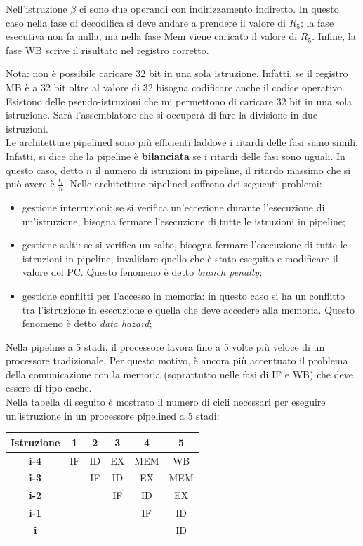 \documentclass{article}
\begin{document}
Nell'istruzione $\beta$ ci sono due operandi con indirizzamento indiretto. In 
questo caso nella fase di decodifica si deve andare a prendere il valore di $R_5
$;
la fase esecutiva non fa nulla, ma nella fase Mem viene caricato il valore di
$R_5$.
Infine, la fase WB scrive il risultato nel registro corretto.

Nota: non è possibile caricare 32 bit in una sola istruzione. 
Infatti, se il registro MB è a 32 bit oltre al valore di 32 bisogna codificare
anche il codice operativo.
Esistono delle pseudo-istruzioni che mi permettono di caricare 32 bit in una 
sola istruzione. Sarà l'assemblatore che si occuperà di fare la divisione 
in due istruzioni.\\ 

Le architetture pipelined sono più efficienti laddove i ritardi delle fasi siano
simili. Infatti, si dice che la pipeline è \textbf{bilanciata} se i ritardi delle 
fasi sono uguali. In questo caso, detto $n$ il numero di istruzioni in pipeline, 
il ritardo massimo che si può avere è $\frac{t_i}{n}$.
Nelle architetture pipelined soffrono dei seguenti problemi:
\begin{itemize}
  \item gestione interruzioni: se si verifica un'eccezione durante l'esecuzione 
    di un'istruzione, bisogna fermare l'esecuzione di tutte le istruzioni in 
    pipeline; 
  \item gestione salti: se si verifica un salto, bisogna fermare l'esecuzione di
    tutte le istruzioni in pipeline, invalidare quello che è stato eseguito e 
    modificare il valore del PC. Questo fenomeno è detto \textit{branch penalty};
  \item gestione conflitti per l'accesso in memoria: in questo caso si ha un 
    conflitto tra l'istruzione in esecuzione e quella che deve accedere alla 
    memoria. Questo fenomeno è detto \textit{data hazard};
\end{itemize}

Nella pipeline a 5 stadi, il processore lavora fino a 5 volte più veloce di un 
processore tradizionale. Per questo motivo, è ancora più accentuato il problema 
della comunicazione con la memoria (soprattutto nelle fasi di IF e WB)
che deve essere di tipo cache.\\

Nella tabella di seguito è mostrato il numero di cicli necessari per eseguire 
un'istruzione in un processore pipelined a 5 stadi:
\begin{center}
  \begin{tabular}{|c|c|c|c|c|c|}
    \hline
    \textbf{Istruzione} & \textbf{1} & \textbf{2} & \textbf{3} & \textbf{4} & 
    \textbf{5} \\
    \hline
    \textbf{i-4} & IF & ID & EX & MEM & WB \\
    \textbf{i-3} &  & IF & ID & EX & MEM \\
    \textbf{i-2} &  &  & IF & ID & EX \\
    \textbf{i-1} &  &  &  & IF & ID \\
    \textbf{i} &  &  &  & & ID \\
    \hline
  \end{tabular}
\end{center}
\end{document}
